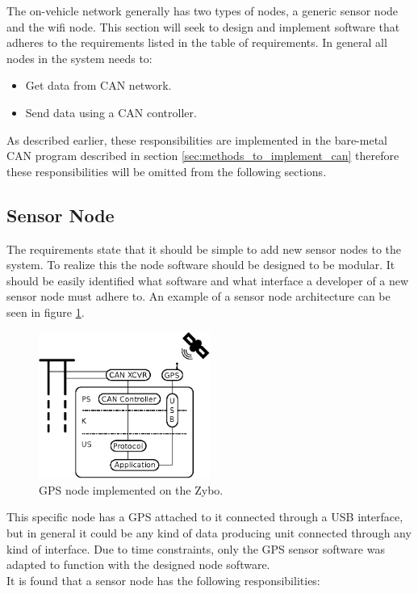 The on-vehicle network generally has two types of nodes, a generic sensor node and the wifi node.
This section will seek to design and implement software that adheres to the requirements listed in the table of requirements.
In general all nodes in the system needs to:
\begin{itemize}
\item Get data from CAN network.
\item Send data using a CAN controller.
\end{itemize}
As described earlier, these responsibilities are implemented in the bare-metal CAN program described in section \ref{sec:methods_to_implement_can} therefore these responsibilities will be omitted from the following sections.

\subsection{Sensor Node}
\label{sec:sensor_node}
The requirements state that it should be simple to add new sensor nodes to the system. 
To realize this the node software should be designed to be modular.
It should be easily identified what software and what interface a developer of a new sensor node must adhere to.
An example of a sensor node architecture can be seen in figure \ref{fig:gps_node}.


\begin{figure}[!h]
\centering
\includegraphics[width=0.5\textwidth]{graphics/analysis_gps.eps}
\caption{GPS node implemented on the Zybo.}
\label{fig:gps_node}
\end{figure}

This specific node has a GPS attached to it connected through a USB interface, but in general it could be any kind of data producing unit connected through any kind of interface.
Due to time constraints, only the GPS sensor software was adapted to function with the designed node software.\\
It is found that a sensor node has the following responsibilities:

